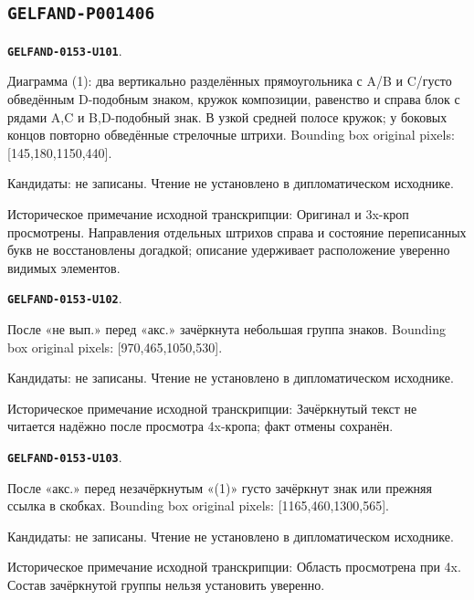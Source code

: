 \documentclass[11pt]{article}
\theoremstyle{definition}
\theoremstyle{remark}
\begin{document}
\subsection*{\texttt{GELFAND-P001406}}
\par\noindent\leavevmode{}\label{GELFAND-0153-U101}\label{GELFAND-P001406:interchange-diagram:note}\textbf{\texttt{GELFAND-0153-U101}}.\nopagebreak[4]\par
Диаграмма (1): два вертикально разделённых прямоугольника с A/B и C/густо обведённым D-подобным знаком, кружок композиции, равенство и справа блок с рядами A,C и B,D-подобный знак. В узкой средней полосе кружок; у боковых концов повторно обведённые стрелочные штрихи. Bounding box original pixels: [145,180,1150,440].\par
Кандидаты: не записаны. Чтение не установлено в дипломатическом исходнике.\par
Историческое примечание исходной транскрипции: Оригинал и 3x-кроп просмотрены. Направления отдельных штрихов справа и состояние переписанных букв не восстановлены догадкой; описание удерживает расположение уверенно видимых элементов.\par\medskip
\par\noindent\leavevmode{}\label{GELFAND-0153-U102}\label{GELFAND-P001406:example-cancel-left:note}\textbf{\texttt{GELFAND-0153-U102}}.\nopagebreak[4]\par
После «не вып.» перед «акс.» зачёркнута небольшая группа знаков. Bounding box original pixels: [970,465,1050,530].\par
Кандидаты: не записаны. Чтение не установлено в дипломатическом исходнике.\par
Историческое примечание исходной транскрипции: Зачёркнутый текст не читается надёжно после просмотра 4x-кропа; факт отмены сохранён.\par\medskip
\par\noindent\leavevmode{}\label{GELFAND-0153-U103}\label{GELFAND-P001406:example-cancel-right:note}\textbf{\texttt{GELFAND-0153-U103}}.\nopagebreak[4]\par
После «акс.» перед незачёркнутым «(1)» густо зачёркнут знак или прежняя ссылка в скобках. Bounding box original pixels: [1165,460,1300,565].\par
Кандидаты: не записаны. Чтение не установлено в дипломатическом исходнике.\par
Историческое примечание исходной транскрипции: Область просмотрена при 4x. Состав зачёркнутой группы нельзя установить уверенно.\par\medskip
\end{document}
